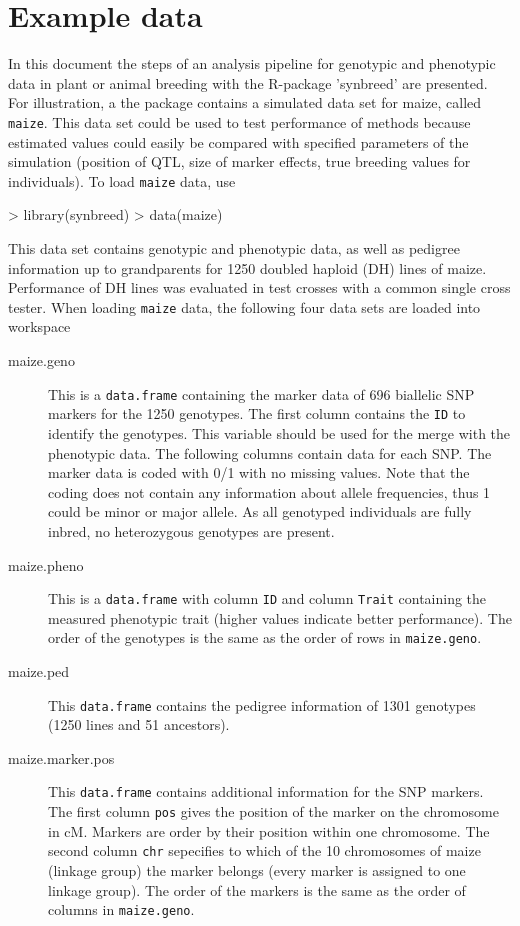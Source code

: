 \documentclass[a4paper,11pt]{article}
\begin{document}
\section{Example data}\label{sec:ExampleData}

In this document the steps of an analysis pipeline for genotypic and phenotypic data in plant or animal breeding with the R-package 'synbreed' are presented. For illustration, a the package contains a simulated data set for maize, called \texttt{maize}. This data set could be used to test performance of methods because estimated values could easily be compared with specified parameters of the simulation (position of QTL, size of marker effects, true breeding values for individuals).
To load \texttt{maize} data, use
\begin{Schunk}
\begin{Sinput}
> library(synbreed)
> data(maize)
\end{Sinput}
\end{Schunk}
This data set contains genotypic and phenotypic data, as well as pedigree information up to grandparents for 1250 doubled haploid (DH) lines of maize. Performance of DH lines was evaluated in test crosses with a common single cross tester. When loading \texttt{maize} data, the following
four data sets are loaded into workspace
\begin{description}
\item[maize.geno]  This is a \texttt{data.frame} containing the marker data of 696 biallelic SNP markers for the 1250 genotypes. 
The first column contains the \texttt{ID} to identify the genotypes.
This variable should be used for the merge with the phenotypic data. The following columns contain data for each SNP.
The marker data is coded with 0/1 with no missing values. Note that the coding does not contain any information about allele frequencies, thus 1 could be minor or major allele. As all genotyped individuals are fully inbred, no heterozygous genotypes are present.
\item[maize.pheno] This is a \texttt{data.frame} with column \texttt{ID} and column \texttt{Trait} containing the measured phenotypic trait (higher values indicate better performance). The order of the genotypes is the same as the order of rows in \texttt{maize.geno}.
\item[maize.ped] This  \texttt{data.frame} contains the pedigree information of  1301 genotypes (1250 lines and 51 ancestors). 
\item[maize.marker.pos]  This  \texttt{data.frame} contains additional information for the SNP markers. The first column \texttt{pos} gives the position of the marker on the chromosome in cM. Markers are order by their position within one chromosome. 
The second column \texttt{chr} sepecifies to which of the 10 chromosomes of maize (linkage group) the marker belongs (every marker is assigned to one linkage group).  The order of the markers is the same as the order of columns in \texttt{maize.geno}.
\end{description}
\end{document}
